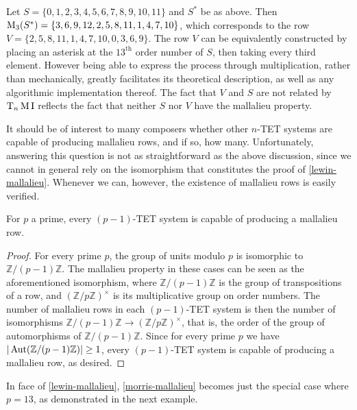 \begin{example}
	Let $S = \{ 0, 1, 2, 3, 4, 5, 6, 7, 8, 9, 10, 11 \}$ and $S^*$ be as above. Then $\operatorname{M}_3(S^*) = \{ 3, 6, 9, 12, 2, 5, 8, 11, 1, 4, 7, 10 \}$, which corresponds to the row $V = \{ 2, 5, 8, 11, 1, 4, 7, 10, 0, 3, 6, 9 \}$. The row $V$ can be equivalently constructed by placing an asterisk at the $13^\text{th}$ order number of $S$, then taking every third element. However being able to express the process through multiplication, rather than mechanically, greatly facilitates its theoretical description, as well as any algorithmic implementation thereof. The fact that $V$ and $S$ are not related by $\operatorname{T}_n\operatorname{M}\operatorname{I}$ reflects the fact that neither $S$ nor $V$ have the mallalieu property.
\end{example}

It should be of interest to many composers whether other $n$-TET systems are capable of producing mallalieu rows, and if so, how many. Unfortunately, answering this question is not as straightforward as the above discussion, since we cannot in general rely on the isomorphism that constitutes the proof of \ref{lewin-mallalieu}. Whenever we can, however, the existence of mallalieu rows is easily verified.

\begin{proposition}
	\label{lewin-mallalieu}
	\cite[285]{Lewin1966}
	For $p$ a prime, every $(p - 1)$-TET system is capable of producing a mallalieu row.
	\begin{proof}
		For every prime $p$, the group of units modulo $p$ is isomorphic to $\mathbb{Z} / (p - 1) \mathbb{Z}$. The mallalieu property in these cases can be seen as the aforementioned isomorphism, where $\mathbb{Z} / (p - 1) \mathbb{Z}$ is the group of transpositions of a row, and $(\mathbb{Z} / p \mathbb{Z})^\times$ is its multiplicative group on order numbers. The number of mallalieu rows in each $(p - 1)$-TET system is then the number of isomorphisms $\mathbb{Z} / (p - 1) \mathbb{Z} \to (\mathbb{Z} / p \mathbb{Z})^\times$, that is, the order of the group of automorphisms of $\mathbb{Z} / (p - 1) \mathbb{Z}$. Since for every prime $p$ we have $|\operatorname{Aut}(\mathbb{Z} / (p - 1) \mathbb{Z})| \geq 1$, every $(p - 1)$-TET system is capable of producing a mallalieu row, as desired.
	\end{proof}
\end{proposition}

In face of \ref{lewin-mallalieu}, \ref{morris-mallalieu} becomes just the special case where $p = 13$, as demonstrated in the next example.

